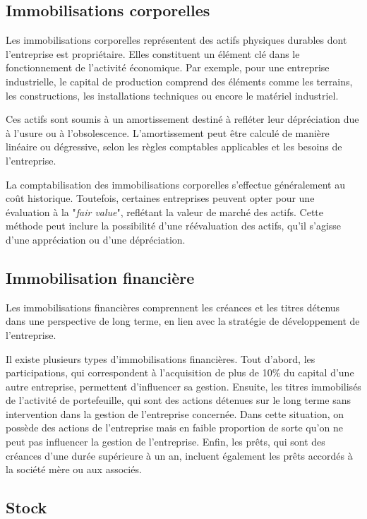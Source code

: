 \documentclass[a4paper, 12pt]{report}
\begin{document}
\subsection{Immobilisations corporelles}

Les immobilisations corporelles représentent des actifs physiques durables dont l'entreprise est propriétaire. Elles constituent un élément clé dans le fonctionnement de l'activité économique. Par exemple, pour une entreprise industrielle, le capital de production comprend des éléments comme les terrains, les constructions, les installations techniques ou encore le matériel industriel.

Ces actifs sont soumis à un amortissement destiné à refléter leur dépréciation due à l'usure ou à l'obsolescence. L'amortissement peut être calculé de manière linéaire ou dégressive, selon les règles comptables applicables et les besoins de l'entreprise. 

La comptabilisation des immobilisations corporelles s'effectue généralement au coût historique. Toutefois, certaines entreprises peuvent opter pour une évaluation à la "\textit{fair value}", reflétant la valeur de marché des actifs. Cette méthode peut inclure la possibilité d’une réévaluation des actifs, qu'il s'agisse d’une appréciation ou d’une dépréciation.

\subsection{Immobilisation financière}

Les immobilisations financières comprennent les créances et les titres détenus dans une perspective de long terme, en lien avec la stratégie de développement de l'entreprise. 

Il existe plusieurs types d'immobilisations financières. Tout d'abord, les participations, qui correspondent à l'acquisition de plus de 10\% du capital d'une autre entreprise, permettent d'influencer sa gestion. Ensuite, les titres immobilisés de l'activité de portefeuille, qui sont des actions détenues sur le long terme sans intervention dans la gestion de l'entreprise concernée. Dans cette situation, on possède des actions de l'entreprise mais en faible proportion de sorte qu'on ne peut pas influencer la gestion de l'entreprise. Enfin, les prêts, qui sont des créances d'une durée supérieure à un an, incluent également les prêts accordés à la société mère ou aux associés.

\subsection{Stock}
\end{document}
